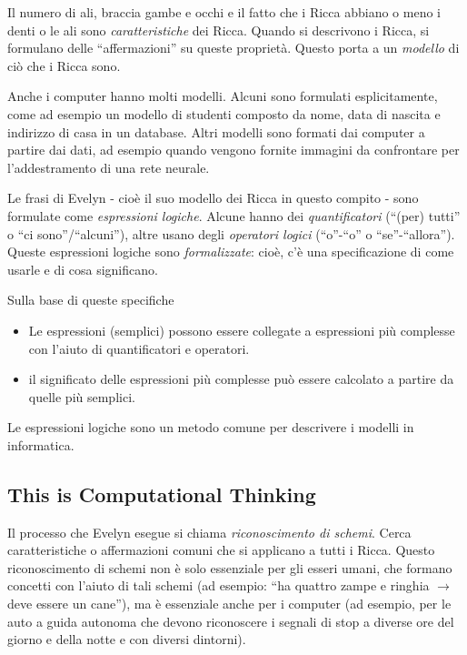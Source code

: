 \documentclass[a4paper,11pt]{report}
\begin{document}
Il numero di ali, braccia gambe e occhi e il fatto che i Ricca abbiano o meno i denti o le ali sono \emph{caratteristiche} dei Ricca. Quando si descrivono i Ricca, si formulano delle \enquote{affermazioni} su queste proprietà. Questo porta a un \emph{modello} di ciò che i Ricca sono.

Anche i computer hanno molti modelli. Alcuni sono formulati esplicitamente, come ad esempio un modello di studenti composto da nome, data di nascita e indirizzo di casa in un database. Altri modelli sono formati dai computer a partire dai dati, ad esempio quando vengono fornite immagini da confrontare per l’addestramento di una rete neurale.

Le frasi di Evelyn - cioè il suo modello dei Ricca in questo compito - sono formulate come \emph{espressioni logiche}. Alcune hanno dei \emph{quantificatori} (\enquote{(per) tutti} o \enquote{ci sono}/\enquote{alcuni}), altre usano degli \emph{operatori logici} (\enquote{o}-\enquote{o} o \enquote{se}-\enquote{allora}). Queste espressioni logiche sono \emph{formalizzate}: cioè, c’è una specificazione di come usarle e di cosa significano.

Sulla base di queste specifiche

\begin{itemize}
  \item Le espressioni (semplici) possono essere collegate a espressioni più complesse con l’aiuto di quantificatori e operatori.
  \item il significato delle espressioni più complesse può essere calcolato a partire da quelle più semplici.
\end{itemize}

Le espressioni logiche sono un metodo comune per descrivere i modelli in informatica.


\subsection*{This is Computational Thinking}

Il processo che Evelyn esegue si chiama \emph{riconoscimento di schemi}. Cerca caratteristiche o affermazioni comuni che si applicano a tutti i Ricca. Questo riconoscimento di schemi non è solo essenziale per gli esseri umani, che formano concetti con l’aiuto di tali schemi (ad esempio: \enquote{ha quattro zampe e ringhia \ensuremath{\rightarrow} deve essere un cane}), ma è essenziale anche per i computer (ad esempio, per le auto a guida autonoma che devono riconoscere i segnali di stop a diverse ore del giorno e della notte e con diversi dintorni).
\end{document}
